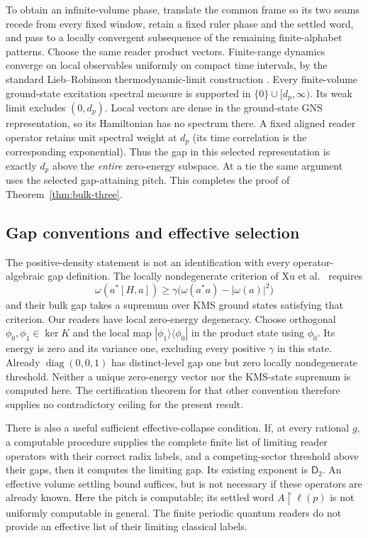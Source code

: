 To obtain an infinite-volume phase, translate the common frame so
its two seams recede from every fixed window, retain a fixed ruler
phase and the settled word, and pass to a locally convergent
subsequence of the remaining finite-alphabet patterns. Choose the
same reader product vectors. Finite-range dynamics converge on
local observables uniformly on compact time intervals, by the
standard Lieb--Robinson thermodynamic-limit construction
\cite{liebRobinson}. Every finite-volume ground-state excitation
spectral measure is supported in $\{0\}\cup[d_p,\infty)$. Its
weak limit excludes $(0,d_p)$. Local vectors are dense in the
ground-state GNS representation, so its Hamiltonian has no spectrum
there. A fixed aligned reader operator retains unit spectral weight
at $d_p$ (its time correlation is the corresponding exponential).
Thus the gap in this selected representation is exactly $d_p$
above the \emph{entire} zero-energy subspace. At a tie the same
argument uses the selected gap-attaining pitch. This completes the
proof of Theorem~\ref{thm:bulk-three}.

\subsection{Gap conventions and effective selection}
\label{subsec:bulk-conventions}
The positive-density statement is not an identification with every
operator-algebraic gap definition. The locally nondegenerate criterion
of Xu et al.\ \cite[equation~(4), Definition~1.11]{bulkGap} requires
\[
 \omega(a^*[H,a])\geq
 \gamma\bigl(\omega(a^*a)-|\omega(a)|^2\bigr)
\]
and their bulk gap takes a supremum over KMS ground states satisfying
that criterion. Our readers have local zero-energy degeneracy.
Choose orthogonal $\phi_0,\phi_1\in\ker K$ and the local map
$|\phi_1\rangle\langle\phi_0|$ in the product state using $\phi_0$.
Its energy is zero and its variance one, excluding every positive
$\gamma$ in this state. Already $\operatorname{diag}(0,0,1)$ has
distinct-level gap one but zero locally nondegenerate threshold.
Neither a unique zero-energy vector nor the KMS-state supremum is
computed here. The certification theorem for that other convention
therefore supplies no contradictory ceiling for the present result.

There is also a useful sufficient effective-collapse condition.
If, at every rational $g$, a computable procedure supplies the
complete finite list of limiting reader operators with their correct
radix labels, and a competing-sector threshold above their gaps,
then it computes the limiting gap. Its existing exponent is
$\mathsf D_2$. An effective volume settling bound suffices, but is
not necessary if these operators are already known. Here the pitch
is computable; its settled word $A\upharpoonright\ell(p)$ is not
uniformly computable in general. The finite periodic quantum readers
do not provide an effective list of their limiting classical labels.

